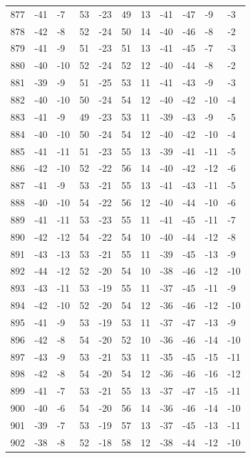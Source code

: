 \begin{table}[H]
\begin{tabular}{lllllllllll}
877 & -41 & -7 & 53 & -23 & 49 & 13 & -41 & -47 & -9 & -3 \\
878 & -42 & -8 & 52 & -24 & 50 & 14 & -40 & -46 & -8 & -2 \\
879 & -41 & -9 & 51 & -23 & 51 & 13 & -41 & -45 & -7 & -3 \\
880 & -40 & -10 & 52 & -24 & 52 & 12 & -40 & -44 & -8 & -2 \\
881 & -39 & -9 & 51 & -25 & 53 & 11 & -41 & -43 & -9 & -3 \\
882 & -40 & -10 & 50 & -24 & 54 & 12 & -40 & -42 & -10 & -4 \\
883 & -41 & -9 & 49 & -23 & 53 & 11 & -39 & -43 & -9 & -5 \\
884 & -40 & -10 & 50 & -24 & 54 & 12 & -40 & -42 & -10 & -4 \\
885 & -41 & -11 & 51 & -23 & 55 & 13 & -39 & -41 & -11 & -5 \\
886 & -42 & -10 & 52 & -22 & 56 & 14 & -40 & -42 & -12 & -6 \\
887 & -41 & -9 & 53 & -21 & 55 & 13 & -41 & -43 & -11 & -5 \\
888 & -40 & -10 & 54 & -22 & 56 & 12 & -40 & -44 & -10 & -6 \\
889 & -41 & -11 & 53 & -23 & 55 & 11 & -41 & -45 & -11 & -7 \\
890 & -42 & -12 & 54 & -22 & 54 & 10 & -40 & -44 & -12 & -8 \\
891 & -43 & -13 & 53 & -21 & 55 & 11 & -39 & -45 & -13 & -9 \\
892 & -44 & -12 & 52 & -20 & 54 & 10 & -38 & -46 & -12 & -10 \\
893 & -43 & -11 & 53 & -19 & 55 & 11 & -37 & -45 & -11 & -9 \\
894 & -42 & -10 & 52 & -20 & 54 & 12 & -36 & -46 & -12 & -10 \\
895 & -41 & -9 & 53 & -19 & 53 & 11 & -37 & -47 & -13 & -9 \\
896 & -42 & -8 & 54 & -20 & 52 & 10 & -36 & -46 & -14 & -10 \\
897 & -43 & -9 & 53 & -21 & 53 & 11 & -35 & -45 & -15 & -11 \\
898 & -42 & -8 & 54 & -20 & 54 & 12 & -36 & -46 & -16 & -12 \\
899 & -41 & -7 & 53 & -21 & 55 & 13 & -37 & -47 & -15 & -11 \\
900 & -40 & -6 & 54 & -20 & 56 & 14 & -36 & -46 & -14 & -10 \\
901 & -39 & -7 & 53 & -19 & 57 & 13 & -37 & -45 & -13 & -11 \\
902 & -38 & -8 & 52 & -18 & 58 & 12 & -38 & -44 & -12 & -10 \\

\end{tabular}
\end{table}
